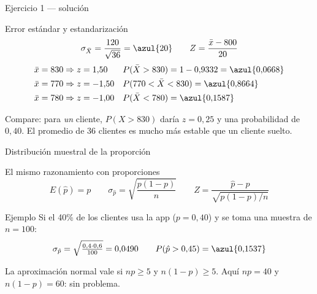 \documentclass[aspectratio=169,10pt]{beamer}
\begin{document}
\begin{frame}{Ejercicio 1 — solución}
  \small
  \begin{block}{Error estándar y estandarización}
    \[ \sigma_{\bar{X}}=\frac{120}{\sqrt{36}}=\azul{20}
       \qquad Z=\frac{\bar{x}-800}{20} \]
    \begin{align*}
      \bar{x}=830 &\Rightarrow z=1{,}50 &&P(\bar{X}>830)=1-0{,}9332=\azul{0{,}0668}\\
      \bar{x}=770 &\Rightarrow z=-1{,}50 &&P(770<\bar{X}<830)=\azul{0{,}8664}\\
      \bar{x}=780 &\Rightarrow z=-1{,}00 &&P(\bar{X}<780)=\azul{0{,}1587}
    \end{align*}
  \end{block}

  \vspace{0.1cm}
  {\footnotesize\color{uniGris} Compare: para \emph{un} cliente,
  $P(X>830)$ daría $z=0{,}25$ y una probabilidad de $0{,}40$. El promedio de 36
  clientes es mucho más estable que un cliente suelto.}
\end{frame}

\begin{frame}{Distribución muestral de la proporción}
  \begin{block}{El mismo razonamiento con proporciones}
    \[ E(\hat{p})=p \qquad
       \sigma_{\hat p}=\sqrt{\frac{p(1-p)}{n}} \qquad
       Z=\frac{\hat{p}-p}{\sqrt{p(1-p)/n}} \]
  \end{block}

  \vspace{0.2cm}
  \begin{exampleblock}{Ejemplo}
    \footnotesize
    Si el 40\% de los clientes usa la app ($p=0{,}40$) y se toma una muestra
    de $n=100$:
    \[ \sigma_{\hat p}=\sqrt{\tfrac{0{,}4\cdot 0{,}6}{100}}=0{,}0490
       \qquad P(\hat{p}>0{,}45)=\azul{0{,}1537} \]
  \end{exampleblock}

  \vspace{0.1cm}
  {\scriptsize\color{uniGris} La aproximación normal vale si $np\ge 5$ y
  $n(1-p)\ge 5$. Aquí $np=40$ y $n(1-p)=60$: sin problema.}
\end{frame}

\end{document}
